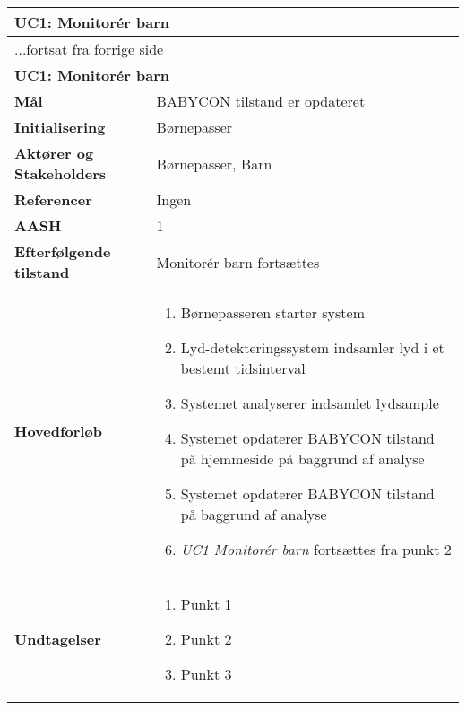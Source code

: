 \begin{center} \centering \label{kravspec:uc1}
	\begin{longtable}{|p{5cm}|p{9cm}|}  %
	\hline
		\multicolumn{2}{|l|}{\textbf{UC1: Monitorér barn}} \\\hline %
		\endfirsthead
		
		\multicolumn{2}{l}{...fortsat fra forrige side} \\ \hline %
		\multicolumn{2}{|l|}{\textbf{UC1: Monitorér barn}} \\\hline %
		\endhead	
		
		\textbf{Mål}							&BABYCON tilstand er opdateret		\\\hline
		\textbf{Initialisering}				&Børnepasser		\\\hline
		\textbf{Aktører og Stakeholders}		&Børnepasser, Barn		\\\hline 
		\textbf{Referencer}					&Ingen		\\\hline
		\textbf{AASH}						&1		\\\hline
		\textbf{Efterfølgende tilstand}		&Monitorér barn fortsættes		\\\hline
		\textbf{Hovedforløb}					
			&\begin{enumerate}
	
				\item Børnepasseren starter system
				
				\item Lyd-detekteringssystem indsamler lyd i et bestemt tidsinterval 				
				
				\item Systemet analyserer indsamlet lydsample 
				
				\item Systemet opdaterer BABYCON tilstand på hjemmeside på baggrund af analyse 				
				
				\item Systemet opdaterer BABYCON tilstand på baggrund af analyse
				
				\item \textit{UC1 Monitorér barn} fortsættes fra punkt 2
				
			\end{enumerate}
		\\\hline
		\textbf{Undtagelser}
			&\begin{enumerate}
			
				\item Punkt 1

				\item Punkt 2
				
				\item Punkt 3

			\end{enumerate}
		\\\hline
	\end{longtable} 
\end{center}

